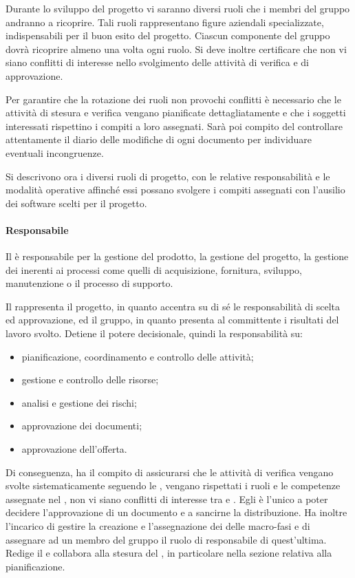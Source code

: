 \documentclass[12pt,a4paper]{article}
\begin{document}
\label{Ruoli}
Durante lo sviluppo del progetto vi saranno diversi ruoli che i membri del gruppo andranno a ricoprire. Tali ruoli rappresentano figure aziendali specializzate, indispensabili per il buon esito del progetto. Ciascun componente del gruppo dovrà ricoprire almeno una volta ogni ruolo. Si deve inoltre certificare che non vi siano conflitti di interesse nello svolgimento delle attività di verifica e di approvazione.

Per garantire che la rotazione dei ruoli non provochi conflitti è necessario che le attività di stesura e verifica vengano pianificate dettagliatamente e che i soggetti interessati rispettino i compiti a loro assegnati. Sarà poi compito del \VR{} controllare attentamente il diario delle modifiche di ogni documento per individuare eventuali incongruenze.

Si descrivono ora i diversi ruoli di progetto, con le relative responsabilità e le modalità operative affinché essi possano svolgere i compiti assegnati con l'ausilio dei software scelti per il progetto.

\paragraph{Responsabile}
Il \PM{} è responsabile per la gestione del prodotto, la gestione del progetto, la gestione dei  inerenti ai processi come quelli di acquisizione, fornitura, sviluppo, manutenzione o il processo di supporto. 

Il \PM{} rappresenta il progetto, in quanto accentra su di sé le responsabilità di scelta ed approvazione, ed il gruppo, in quanto presenta al committente i risultati del lavoro svolto.
Detiene il potere decisionale, quindi la responsabilità su:
\begin{itemize}
	\item pianificazione, coordinamento e controllo delle attività;
	\item gestione e controllo delle risorse;
	\item analisi e gestione dei rischi;
	\item approvazione dei documenti;
	\item approvazione dell'offerta.
\end{itemize}

Di conseguenza, ha il compito di assicurarsi che le attività di verifica vengano svolte sistematicamente seguendo le \NdP, vengano rispettati i ruoli e le competenze assegnate nel \PdP{}, non vi siano conflitti di interesse tra  e . Egli è l'unico a poter decidere l'approvazione di un documento e a sancirne la distribuzione.
Ha inoltre l'incarico di gestire la creazione e l'assegnazione dei  delle macro-fasi e di assegnare ad un membro del gruppo il ruolo di responsabile di quest'ultima.
Redige il \PdP{} e collabora alla stesura del \PdQ{}, in particolare nella sezione relativa alla pianificazione.
\end{document}
